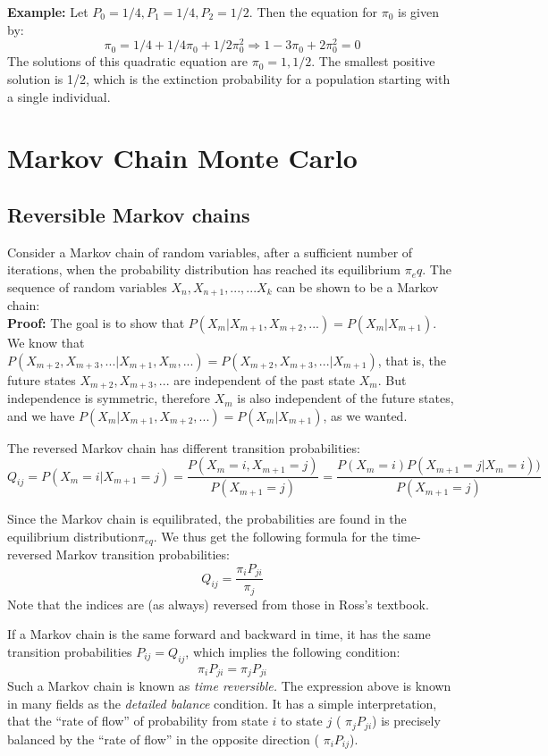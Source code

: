 \documentclass[11pt]{book}
\begin{document}
\textbf{Example:} Let $P_0 = 1/4, P_1 = 1/4, P_2 = 1/2$. Then the equation for $\pi_0$ is given by:
$$ \pi_0 = 1/4 + 1/4 \pi_0 + 1/2 \pi_0^2 \Rightarrow 1 - 3 \pi_0 + 2\pi_0^2 = 0$$
The solutions of this quadratic equation are $\pi_0 = 1, 1/2$. The smallest positive solution is 1/2, which is the extinction probability for a population starting with a single individual.

\section{Markov Chain Monte Carlo}

\subsection{Reversible Markov chains}

Consider a Markov chain of random variables, after a sufficient number of iterations, when the probability distribution has reached its equilibrium $\pi_eq$.
The sequence of random variables $X_n, X_{n+1}, ... , ... X_{k}$ can be shown to be a Markov chain:\\
\textbf{Proof:} The goal is to show that $P(X_ m | X_{m+1}, X_{m+2}, ... ) = P(X_ m | X_{m+1})$. We know that \\
$P(X_ {m+2}, X_{m+3}, ... | X_{m+1}, X_{m}, ... ) = P(X_ {m+2}, X_{m+3}, ... | X_{m+1})$, that is, the future states $X_{m+2}, X_{m+3}, ...$ are independent of the past state $X_{m}$. But independence is symmetric, therefore $X_{m}$ is also independent of the future states, and we have $P(X_ m | X_{m+1}, X_{m+2}, ... ) = P(X_ m | X_{m+1})$, as we wanted.


The reversed Markov chain has different transition probabilities:
$$ Q_{ij} = P(X_m = i | X_{m+1} = j) = \frac{P(X_m = i, X_{m+1} = j)}{P(X_{m+1} = j)} = \frac{P(X_{m} = i) P(X_{m+1} = j | X_{m} = i))}{P(X_{m+1} = j)} $$

Since the  Markov chain is equilibrated, the probabilities are found in the equilibrium distribution$\pi_{eq}$. We thus get the following formula for the time-reversed Markov transition probabilities:
$$ Q_{ij} = \frac{\pi_i P_{ji}}{\pi_j} $$
Note that the indices are (as always) reversed from those in Ross's textbook.

If a Markov chain is the same forward and backward in time, it has the same transition probabilities $P_{ij} = Q_{ij}$, which implies the following condition:
$$ \pi_i P_{ji} = \pi_j P_{ji}$$
Such a Markov chain is known as \emph{time reversible.} The expression above is known in many fields as the \emph{detailed balance} condition. It has a simple interpretation, that the ``rate of flow'' of probability from state $i$ to state $j$ ( $\pi_j P_{ji}$) is precisely balanced by the ``rate of flow'' in the opposite direction ( $\pi_i P_{ij}$). 
\end{document}
